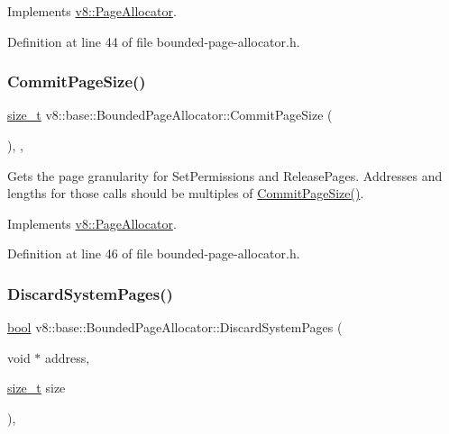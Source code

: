 Implements \mbox{\hyperlink{classv8_1_1PageAllocator_a92c2f6dbb3afa6c47dafd4c12ab4641f}{v8\+::\+Page\+Allocator}}.



Definition at line 44 of file bounded-\/page-\/allocator.\+h.

\mbox{\label{classv8_1_1base_1_1BoundedPageAllocator_a68462e5a1751aa3a8fb0068deca16c5f}} 
\subsubsection{\texorpdfstring{Commit\+Page\+Size()}{CommitPageSize()}}
{\footnotesize\ttfamily \mbox{\hyperlink{classsize__t}{size\+\_\+t}} v8\+::base\+::\+Bounded\+Page\+Allocator\+::\+Commit\+Page\+Size (\begin{DoxyParamCaption}{ }\end{DoxyParamCaption})\hspace{0.3cm}{\ttfamily [inline]}, {\ttfamily [override]}, {\ttfamily [virtual]}}

Gets the page granularity for Set\+Permissions and Release\+Pages. Addresses and lengths for those calls should be multiples of \mbox{\hyperlink{classv8_1_1base_1_1BoundedPageAllocator_a68462e5a1751aa3a8fb0068deca16c5f}{Commit\+Page\+Size()}}. 

Implements \mbox{\hyperlink{classv8_1_1PageAllocator_ad817d87004151e3824997415f2dc57e9}{v8\+::\+Page\+Allocator}}.



Definition at line 46 of file bounded-\/page-\/allocator.\+h.

\mbox{\label{classv8_1_1base_1_1BoundedPageAllocator_a31ae3d1e2696d53c6ac47e2f525bc1e7}} 
\subsubsection{\texorpdfstring{Discard\+System\+Pages()}{DiscardSystemPages()}}
{\footnotesize\ttfamily \mbox{\hyperlink{classbool}{bool}} v8\+::base\+::\+Bounded\+Page\+Allocator\+::\+Discard\+System\+Pages (\begin{DoxyParamCaption}\item[{void $\ast$}]{address,  }\item[{\mbox{\hyperlink{classsize__t}{size\+\_\+t}}}]{size }\end{DoxyParamCaption})\hspace{0.3cm}{\ttfamily [override]}, {\ttfamily [virtual]}}

